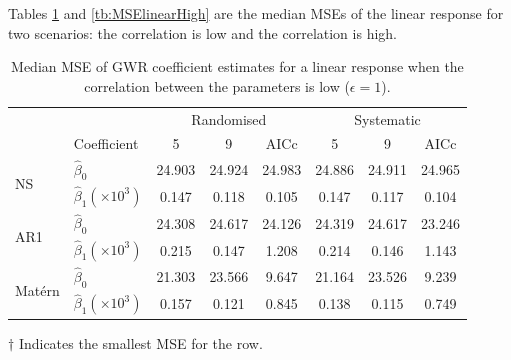 \documentclass[a4paper]{article} 	%
\newcommand{\Matern}{Mat\'ern }
\begin{document}
Tables \ref{tb:MSElinear} and \ref{tb:MSElinearHigh} are the median MSEs of the linear response for two scenarios: the correlation is low and the correlation is high.

\begin{table}[!htp]
	\centering
\begin{threeparttable}
	\caption{Median MSE of GWR coefficient estimates for a linear response when the correlation between the parameters is low ($\epsilon=1$).}\label{tb:MSElinear}
	\begin{tabular}{llcccccc}
		\toprule
		&  & \multicolumn{3}{c}{Randomised} & \multicolumn{3}{c}{Systematic} \\ 
   		 & Coefficient & 5  &  9  & AICc & 5   & 9  & AICc \\ \midrule
		\multirow{2}{*}{NS}   & $\hat{\beta}_0$ & 24.903 &	24.924 &	24.983&	24.886\tnote{$\dagger$} &	24.911 &	24.965 \\ 
		& $\hat{\beta}_1 (\times 10^3)$ & 0.147&	0.118&	0.105&	0.147&	0.117&	0.104\tnote{$\dagger$}  \\  \midrule
		\multirow{2}{*}{AR1}  & $\hat{\beta}_0$ & 24.308&	24.617&	24.126&	24.319&	24.617&	23.246\tnote{$\dagger$}  \\ 
		& $\hat{\beta}_1 (\times 10^3)$ & 0.215	&0.147	&1.208&	0.214&	0.146\tnote{$\dagger$}	&1.143 \\ \midrule
		\multirow{2}{*}{\Matern} & $\hat{\beta}_0$ & 21.303	&23.566	&9.647&	21.164&	23.526&	9.239\tnote{$\dagger$} \\ 
		& $\hat{\beta}_1 (\times 10^3)$ & 0.157	&0.121&	0.845&	0.138&	0.115\tnote{$\dagger$} &	0.749 \\
		\bottomrule
	\end{tabular}
	\begin{tablenotes}
	\item[$\dagger$] \footnotesize Indicates the smallest MSE for the row.
	\end{tablenotes}
\end{threeparttable}
\end{table}
\end{document}
